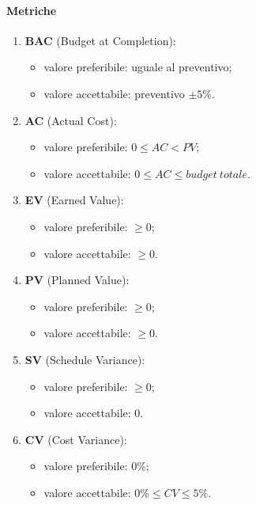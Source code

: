         \paragraph{Metriche}
            \begin{enumerate}
                \item \textbf{BAC} (Budget at Completion):
                \begin{itemize}
                    \item valore preferibile: uguale al preventivo;
                    \item valore accettabile: preventivo $\pm 5\%$.
                \end{itemize}
                \item \textbf{AC} (Actual Cost):
                \begin{itemize}
                    \item valore preferibile: $0 \leq AC < PV$;
                    \item valore accettabile: $0 \leq AC \leq budget\ totale$.
                \end{itemize}
                \item \textbf{EV} (Earned Value):
                \begin{itemize}
                    \item valore preferibile: $\geq 0$;
                    \item valore accettabile: $\geq 0$.
                \end{itemize}
                \item \textbf{PV} (Planned Value):
                \begin{itemize}
                    \item valore preferibile: $\geq 0$;
                    \item valore accettabile: $\geq 0$.
                \end{itemize}
                \item \textbf{SV} (Schedule Variance):
                \begin{itemize}
                    \item valore preferibile: $\geq 0$;
                    \item valore accettabile: $0$.
                \end{itemize}
                \item \textbf{CV} (Cost Variance):
                \begin{itemize}
                    \item valore preferibile: $0\%$;
                    \item valore accettabile: $0\% \leq CV \leq 5\%$.
                \end{itemize}
            \end{enumerate}
